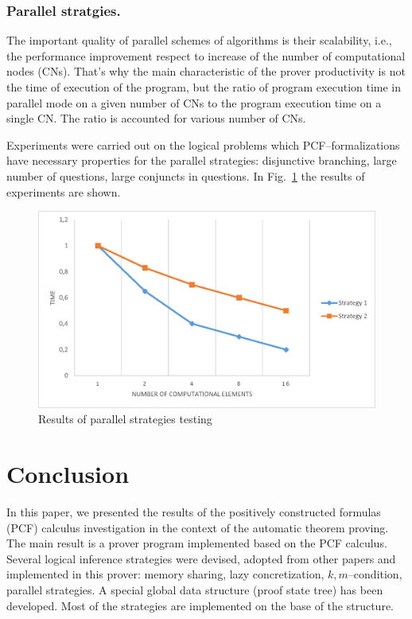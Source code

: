 \documentclass[runningheads,a4paper]{llncs}
\begin{document}
\subsubsection{Parallel stratgies.}
The important quality of parallel schemes of algorithms is their scalability, i.e., the performance improvement respect to increase of the number of computational nodes (CNs). That’s why the main characteristic of the prover productivity is not the time of execution of the program, but the ratio of program execution time in parallel mode on a given number of CNs to the program execution time on a single CN. The ratio is accounted for various number of CNs.

Experiments were carried out on the logical problems which PCF--formalizations have necessary properties for the parallel strategies: disjunctive branching, large number of questions, large conjuncts in questions. In Fig.~\ref{fig:parallel} the results of experiments are shown.

\begin{figure}[h]
  \centering
  \includegraphics[width=0.8\linewidth]{img/Parallel.eps}
  \caption{Results of parallel strategies testing}
  \label{fig:parallel}
\end{figure}




\section*{Conclusion}
In this paper, we presented the results of the positively constructed formulas (PCF) calculus investigation in the context of the automatic theorem proving. The main result is a prover program implemented based on the PCF calculus. Several logical inference strategies were devised, adopted from other papers and implemented in this prover: memory sharing, lazy concretization, $k,m$--condition, parallel strategies. A special global data structure (proof state tree) has been developed. Most of the strategies are implemented on the base of the structure.
\end{document}
